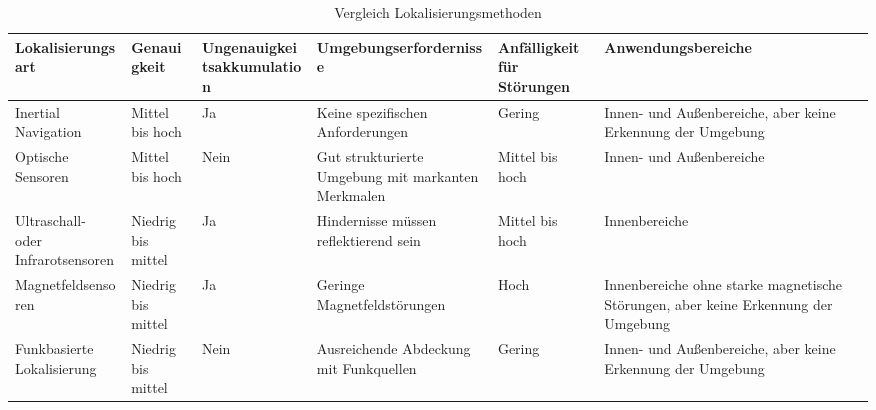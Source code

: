 \begin{table}[H]
\begin{center}
   \fontsize{7}{11}\selectfont
    \begin{tabular}{|p{2cm}|p{2cm}|p{2cm}|p{3cm}|p{2cm}|p{3cm}|}
    \hline
    \textbf{Lokalisier\-ungsart} & \textbf{Genauigkeit} & \textbf{Ungenauigkeits\-akkumulation} & \textbf{Umgebungs\-erfordernisse} & \textbf{Anfälligkeit für Störungen} & \textbf{Anwendungsbereiche} \\\hline
    Inertial Navigation & Mittel bis hoch & Ja & Keine spezifischen Anforderungen & Gering & Innen- und Außenbereiche, aber keine Erkennung der Umgebung \\\hline
    Optische Sensoren & Mittel bis hoch & Nein & Gut strukturierte Umgebung mit markanten Merkmalen & Mittel bis hoch & Innen- und Außenbereiche \\\hline
    Ultraschall- oder Infrarotsensoren & Niedrig bis mittel & Ja & Hindernisse müssen reflektierend sein & Mittel bis hoch & Innenbereiche \\\hline
    Magnetfeld\-sensoren & Niedrig bis mittel & Ja & Geringe Magnetfeldstörungen & Hoch & Innenbereiche ohne starke magnetische Störungen, aber keine Erkennung der Umgebung \\\hline
    Funkbasierte Lokalisierung & Niedrig bis mittel & Nein & Ausreichende Abdeckung mit Funkquellen & Gering & Innen- und Außenbereiche, aber keine Erkennung der Umgebung \\\hline
    \end{tabular}
    \caption{Vergleich Lokalisierungsmethoden}\label{tab:vergleich}
    \end{center}
\end{table}

